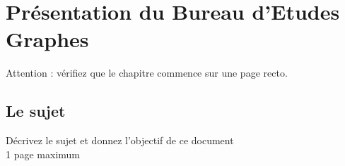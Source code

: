 \chapter{Présentation du Bureau d'Etudes Graphes}

Attention : vérifiez que le chapitre commence sur une page recto.

\section{Le sujet}
Décrivez le sujet et donnez l'objectif de ce document 
\\
1 page maximum
